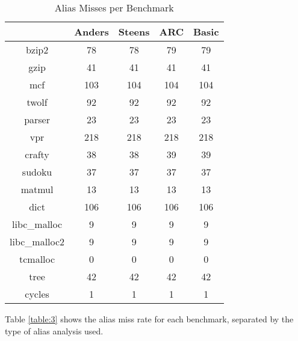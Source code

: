 \begin{table} [h!]
\centering
   \begin{tabular} {|c|c c c c|}
      \hline
      & Anders & Steens & ARC & Basic \\
      \hline
	   bzip2 & 78 & 78 & 79 & 79 \\
      \hline
	   gzip & 41 & 41 & 41 & 41 \\
      \hline
           mcf & 103 & 104 & 104 & 104 \\
      \hline
	   twolf & 92 & 92 & 92 & 92 \\
      \hline
	   parser & 23 & 23 & 23 & 23 \\
      \hline
	   vpr & 218 & 218 & 218 & 218 \\
      \hline
	   crafty & 38 & 38 & 39 & 39 \\
      \hline
	   sudoku & 37 & 37 & 37 & 37 \\
      \hline
	   matmul & 13 & 13 & 13 & 13 \\
      \hline
	   dict & 106 & 106 & 106 & 106 \\
      \hline
	   libc\_malloc & 9 & 9 & 9 & 9 \\
      \hline
	   libc\_malloc2 & 9 & 9 & 9 & 9 \\
      \hline
	   tcmalloc & 0 & 0 & 0 & 0 \\
      \hline
	   tree & 42 & 42 & 42 & 42 \\
      \hline
	   cycles & 1 & 1 & 1 & 1 \\
      \hline
   \end{tabular}
   \caption{Alias Misses per Benchmark}
   \label{table:2}
\end{table}

\newpage

Table \ref{table:3} shows the alias miss rate for each benchmark, separated by the type of alias analysis used.

